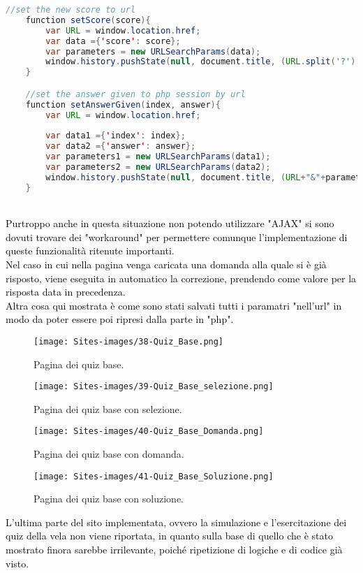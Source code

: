 \begin{lstlisting}[language=java]
	//set the new score to url
	function setScore(score){
		var URL = window.location.href;
		var data ={'score': score};
		var parameters = new URLSearchParams(data);
		window.history.pushState(null, document.title, (URL.split('?')[0]+"?"+parameters))
	}

	//set the answer given to php session by url
	function setAnswerGiven(index, answer){
		var URL = window.location.href;
	
		var data1 ={'index': index};
		var data2 ={'answer': answer};
		var parameters1 = new URLSearchParams(data1);
		var parameters2 = new URLSearchParams(data2);
		window.history.pushState(null, document.title, (URL+"&"+parameters1+"&"+parameters2));
	}
\end{lstlisting}\leavevmode\\
\textcolor{black}{Purtroppo anche in questa situazione non potendo utilizzare "AJAX" si sono dovuti trovare dei "workaround" per permettere comunque l'implementazione di queste funzionalità ritenute importanti.\\
Nel caso in cui nella pagina venga caricata una domanda alla quale si è già risposto, viene eseguita in automatico la correzione, prendendo come valore per la risposta data in precedenza.\\
Altra cosa qui mostrata è come sono stati salvati tutti i paramatri "nell'url" in modo da poter essere poi ripresi dalla parte in "php".}\\

\begin{figure}[h]
	\begin{center}
		\texttt{[image: Sites-images/38-Quiz\_Base.png]}
		\caption{Pagina dei quiz base.}
	\end{center}
\end{figure}

\begin{figure}[h]
	\begin{center}
		\texttt{[image: Sites-images/39-Quiz\_Base\_selezione.png]}
		\caption{Pagina dei quiz base con selezione.}
	\end{center}
\end{figure}

\begin{figure}[h]
	\begin{center}
		\texttt{[image: Sites-images/40-Quiz\_Base\_Domanda.png]}
		\caption{Pagina dei quiz base con domanda.}
	\end{center}
\end{figure}

\begin{figure}[h]
	\begin{center}
		\texttt{[image: Sites-images/41-Quiz\_Base\_Soluzione.png]}
		\caption{Pagina dei quiz base con soluzione.}
	\end{center}
\end{figure}

\textcolor{black}{L'ultima parte del sito implementata, ovvero la simulazione e l'esercitazione dei quiz della vela non viene riportata, in quanto sulla base di quello che è stato mostrato finora sarebbe irrilevante, poiché ripetizione di logiche e di codice già visto.} 